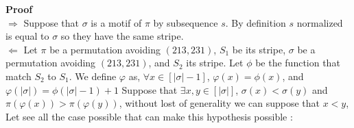 \documentclass[a4paper]{llncs}
\newcommand{\ptext}{\pi}
\newcommand{\pmotif}{\sigma}
\begin{document}
		\textbf{Proof} \\
		$\Rightarrow$ Suppose that $\pmotif$ is a motif of $\ptext$
		by subsequence $s$.
		By definition $s$ normalized is equal to
		$\pmotif$ so they have the same stripe.\\ 
		$\Leftarrow$ 
		Let $\ptext$ be a permutation avoiding $(213,231)$, 
		$S_1$ be its stripe, 
		$\pmotif$  be a permutation avoiding $(213,231)$, 
		and $S_2$ its stripe.
		Let $\phi$ be the function
		that match $S_2$ to $S_1$.
		We define $\varphi$ as, 
		$\forall x \in [|\pmotif|-1]$,
		$\varphi(x) = \phi(x)$,
		and $\varphi(|\pmotif|) = \phi(|\pmotif|-1)+1$
		Suppose that $\exists x,y \in [|\pmotif|]$, 
		$\pmotif(x)<\pmotif(y)$ 
		and $\ptext(\varphi(x))>\ptext(\varphi(y))$,
		without lost of generality we can suppose that $x<y$,
		Let see all the case possible that can make this 
		hypothesis possible :
\end{document}
